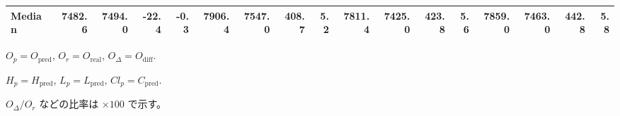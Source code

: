 \begin{threeparttable}
{\begin{tabular}{lrrrrrrrrrrrrrrrr}
 Median & 7482.6 & 7494.0 &      -22.4 &           -0.3 &  7906.4 & 7547.0 &      408.7 &            5.2 & 7811.4 & 7425.0 &      423.8 &            5.6 & 7859.0 & 7463.0 &       442.8 &              5.8 \\
\bottomrule
\end{tabular}
}
\begin{tablenotes}\footnotesize
\item $O_p=O_{\text{pred}}$, $O_r=O_{\text{real}}$, $O_\Delta=O_{\text{diff}}$.
\item $H_p=H_{\text{pred}}$, $L_p=L_{\text{pred}}$, $Cl_p=C_{\text{pred}}$.
\item $O_\Delta/O_r$ などの比率は \(\times100\) で示す。
\end{tablenotes}
\end{threeparttable}
\endgroup
